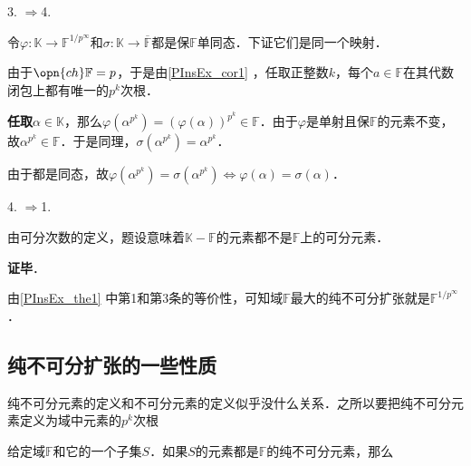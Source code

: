 3. $\Rightarrow$4. 

令$\varphi:\mathbb{K}\to\mathbb{F}^{1/p^\infty}$和$\sigma:\mathbb{K}\to\overline{\mathbb{F}}$都是保$\mathbb{F}$单同态．下证它们是同一个映射．

由于$\opn{ch}\mathbb{F}=p$，于是由\autoref{PInsEx_cor1} ，任取正整数$k$，每个$a\in\mathbb{F}$在其代数闭包上都有唯一的$p^k$次根．

\textbf{任取}$\alpha\in\mathbb{K}$，那么$\varphi(\alpha^{p^k})=(\varphi(\alpha))^{p^k}\in\mathbb{F}$．由于$\varphi$是单射且保$\mathbb{F}$的元素不变，故$\alpha^{p^k}\in\mathbb{F}$．于是同理，$\sigma(\alpha^{p^k})=\alpha^{p^k}$．

由于都是同态，故$\varphi(\alpha^{p^k})=\sigma(\alpha^{p^k})\iff \varphi(\alpha)=\sigma(\alpha)$．

4. $\Rightarrow$1. 

由可分次数的定义，题设意味着$\mathbb{K}-\mathbb{F}$的元素都不是$\mathbb{F}$上的可分元素．


\textbf{证毕}．

由\autoref{PInsEx_the1} 中第1和第3条的等价性，可知域$\mathbb{F}$最大的纯不可分扩张就是$\mathbb{F}^{1/p^\infty}$．





\subsection{纯不可分扩张的一些性质}

纯不可分元素的定义和不可分元素的定义似乎没什么关系．之所以要把纯不可分元素定义为域中元素的$p^k$次根

\begin{theorem}{}
给定域$\mathbb{F}$和它的一个子集$S$．如果$S$的元素都是$\mathbb{F}$的纯不可分元素，那么
\end{theorem}









